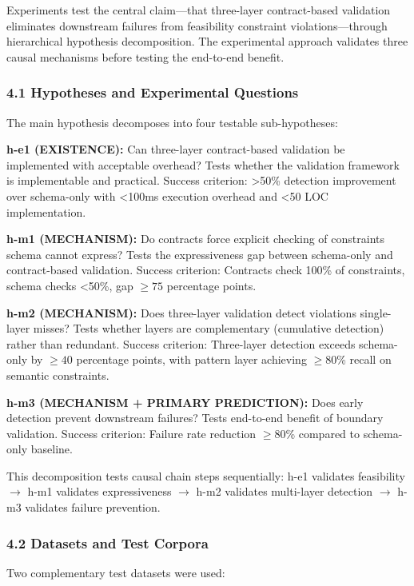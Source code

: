 
Experiments test the central claim---that three-layer contract-based validation eliminates downstream failures from feasibility constraint violations---through hierarchical hypothesis decomposition. The experimental approach validates three causal mechanisms before testing the end-to-end benefit.

\subsubsection{4.1 Hypotheses and Experimental Questions}

The main hypothesis decomposes into four testable sub-hypotheses:

\textbf{h-e1 (EXISTENCE):} Can three-layer contract-based validation be implemented with acceptable overhead? Tests whether the validation framework is implementable and practical. Success criterion: >50\% detection improvement over schema-only with <100ms execution overhead and <50 LOC implementation.

\textbf{h-m1 (MECHANISM):} Do contracts force explicit checking of constraints schema cannot express? Tests the expressiveness gap between schema-only and contract-based validation. Success criterion: Contracts check 100\% of constraints, schema checks <50\%, gap $\geq 75$ percentage points.

\textbf{h-m2 (MECHANISM):} Does three-layer validation detect violations single-layer misses? Tests whether layers are complementary (cumulative detection) rather than redundant. Success criterion: Three-layer detection exceeds schema-only by $\geq 40$ percentage points, with pattern layer achieving $\geq 80$\% recall on semantic constraints.

\textbf{h-m3 (MECHANISM + PRIMARY PREDICTION):} Does early detection prevent downstream failures? Tests end-to-end benefit of boundary validation. Success criterion: Failure rate reduction $\geq 80$\% compared to schema-only baseline.

This decomposition tests causal chain steps sequentially: h-e1 validates feasibility $\rightarrow$ h-m1 validates expressiveness $\rightarrow$ h-m2 validates multi-layer detection $\rightarrow$ h-m3 validates failure prevention.

\subsubsection{4.2 Datasets and Test Corpora}

Two complementary test datasets were used:

